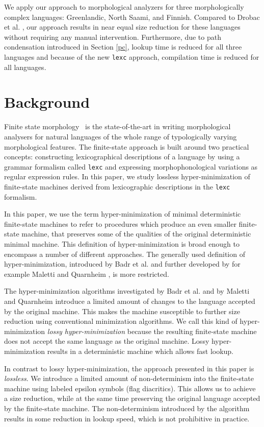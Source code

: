 \documentclass[11pt]{article}
\begin{document}
We apply our approach to morphological analyzers for three
morphologically complex languages: Greenlandic, North Saami, and
Finnish. Compared to Drobac et al. , our
approach results in near equal size reduction for these languages
without requiring any manual intervention. Furthermore, due to path condensation introduced in Section \ref{pc},
lookup time is reduced for all three languages and because of the
new \texttt{lexc} approach, compilation time is reduced for all
languages.

\section{Background}
Finite state morphology~\cite{beesley2003finite} is the
state-of-the-art in writing morphological analysers for natural
languages of the whole range of typologically varying morphological
features. The finite-state approach is built around two practical
concepts: constructing lexicographical descriptions of a language
by using a grammar formalism called \texttt{lexc} and expressing morphophonological
variations as regular expression rules. In this paper, we study lossless
hyper-minimization of finite-state machines derived from lexicographic
descriptions in the \texttt{lexc} formalism.

In this paper, we use the term hyper-minimization of minimal
deterministic finite-state machines to refer to procedures which
produce an even smaller finite-state machine, that preserves some of
the qualities of the original deterministic minimal machine. This
definition of hyper-minimization is broad enough to encompass a number
of different approaches. The generally used definition of
hyper-minimization, introduced by Badr et al.  and
further developed by for example Maletti and Quarnheim , is
more restricted.

The hyper-minimization algorithms investigated by Badr et
al.  and by Maletti and Quarnheim
 introduce a limited amount of changes to the
language accepted by the original machine. This makes the machine
susceptible to further size reduction using conventional minimization
algorithms. We call this kind of hyper-minimization {\it lossy
  hyper-minimization} because the resulting finite-state machine does
not accept the same language as the original machine. Lossy
hyper-minimization results in a deterministic machine which allows
fast lookup.

In contrast to lossy hyper-minimization, the approach presented in
this paper is {\it lossless}. We introduce a limited amount of
non-determinism into the finite-state machine using labeled epsilon
symbols (flag diacritics). This allows us to achieve a size reduction,
while at the same time preserving the original language accepted by
the finite-state machine. The non-determinism introduced by the
algorithm results in some reduction in lookup speed, which is not
prohibitive in practice.
\end{document}

